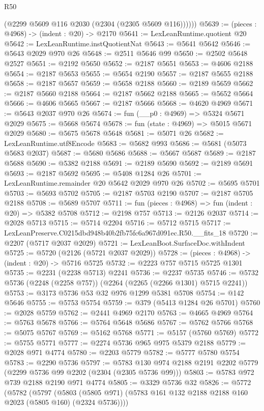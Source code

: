 \begin{lexlean}{R50}
\begin{coremodule}
          (@2299 @5609 @116 @2030 (@2304 (@2305 @5609 @116))))))
@5639 := (pieces : @4968) -> (indent : @20) -> @2170
@5641 := LexLeanRuntime.quotient @20
@5642 := LexLeanRuntime.instQuotientNat
@5643 := @5641 @5642
@5646 := @5643 @2029 @970 @26
@5648 := @2511 @5646 @99
@5650 := @2502 @5648 @2527
@5651 := @2192 @5650
@5652 := @2187 @5651
@5653 := @4606 @2188
@5654 := @2187 @5653
@5655 := @5654 @2190
@5657 := @2187 @5655 @2188
@5658 := @2187 @5657
@5659 := @5658 @2188
@5660 := @2189 @5659
@5662 := @2187 @5660 @2188
@5664 := @2187 @5662 @2188
@5665 := @5652 @5664
@5666 := @4606 @5665
@5667 := @2187 @5666
@5668 := @4620 @4969
@5671 := @5643 @2037 @970 @26
@5674 := fun (__p0 : @4969) => @5324 @5671 @2029
@5675 := @5668 @5674
@5678 := fun (state : @4969) => @5015 @5671 @2029
@5680 := @5675 @5678 @5648
@5681 := @5071 @26
@5682 := LexLeanRuntime.utf8Encode
@5683 := @5682 @993
@5686 := @5681 (@5073 @5683 @2037)
@5687 := @5680 @5686
@5688 := @5667 @5687
@5689 := @2187 @5688
@5690 := @5382 @2188
@5691 := @2189 @5690
@5692 := @2189 @5691
@5693 := @2187 @5692
@5695 := @5408 @1284 @26
@5701 := LexLeanRuntime.remainder @20 @5642 @2029 @970 @26
@5702 := @5695 @5701
@5703 := @5693 @5702
@5705 := @2187 @5703 @2190
@5707 := @2187 @5705 @2188
@5708 := @5689 @5707
@5711 := fun (pieces : @4968) => fun (indent : @20) => @5382 @5708
@5712 := @2198 @757
@5713 := @2126 @2037
@5714 := @2028 @5713
@5715 := @5714 @2204
@5716 := @5712 @5715
@5717 := LexLeanPreserve.C0215dbd948b40b2fb75fc6a967d091ec.R50.__fits_18
@5720 := @2207 (@5717 @2037 @2029)
@5721 := LexLeanBoot.SurfaceDoc.withIndent
@5725 := @5720 (@2126 (@5721 @2037 @2029))
@5728 := (pieces : @4968) -> (indent : @20) -> @5716 @5725
@5732 := @2223 @757 @5715 @5725 @1301
@5735 := @2231 (@2238 @5713) @2241
@5736 := @2237 @5735
@5746 := @5732 @5736 (@2248 (@2258 @757)) (@2264 (@2265 (@2266 @1301) @5715 @2241))
@5753 := @3173 @5736 @53 @32 @976 @1299 @5381 @5708
@5754 := @142 @5646
@5755 := @5753 @5754
@5759 := @379 (@5413 @1284 @26 @5701)
@5760 := @2028 @5759
@5762 := @2441 @4969 @2170
@5763 := @4665 @4969
@5764 := @5763 @5678
@5766 := @5764 @5648 @5686
@5767 := @5762 @5766
@5768 := @5075 @5767
@5769 := @5162 @5768
@5771 := @5157 (@5760 @5769)
@5772 := @5755 @5771
@5777 := @2274 @5736 @965 @975 @5379 @2188
@5779 := @2028 @971 @4774
@5780 := @2203 @5779
@5782 := @5777 @5780 @5754
@5783 := @2290 @5736
@5797 := @5783 @130 @974 @2188 @2191 @2202 @5779 (@2299 @5736 @99 @2202 (@2304 (@2305 @5736 @99)))
@5803 := @5783 @972 @739 @2188 @2190 @971 @4774
@5805 := @3329 @5736 @32
@5826 := @5772
    (@5782
      (@5797
        (@5803 (@5805 @971) (@5783 @161 @132 @2188 @2188 @160 @2023 (@5805 @160) (@2324 @5736))))

\end{coremodule}
\end{lexlean}
